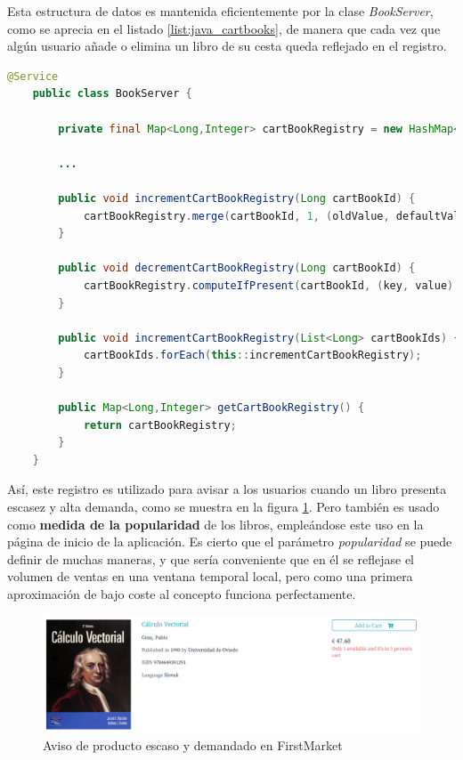 \documentclass[a4paper]{article}
\begin{document}
    Esta estructura de datos es mantenida eficientemente por la clase \emph{BookServer}, como se aprecia en el listado \ref{list:java_cartbooks}, de manera que cada vez que algún usuario añade o elimina un libro de su cesta queda reflejado en el registro.
    \\
    
    \begin{lstlisting}[language=Java,caption=Gestión del registro de libros referenciados en cestas,label=list:java_cartbooks]
    @Service
    public class BookServer {
    
    	private final Map<Long,Integer> cartBookRegistry = new HashMap<>();
    	
    	...
    	
	    public void incrementCartBookRegistry(Long cartBookId) {
		    cartBookRegistry.merge(cartBookId, 1, (oldValue, defaultValue) -> ++oldValue);
	    }
	    
	    public void decrementCartBookRegistry(Long cartBookId) {
		    cartBookRegistry.computeIfPresent(cartBookId, (key, value) -> (value > 1L) ? --value : null);
	    }
	    
	    public void incrementCartBookRegistry(List<Long> cartBookIds) {
	    	cartBookIds.forEach(this::incrementCartBookRegistry);
	    }
	    
	    public Map<Long,Integer> getCartBookRegistry() {
	    	return cartBookRegistry;
	    }
    }
    \end{lstlisting}
    
    Así, este registro es utilizado para avisar a los usuarios cuando un libro presenta escasez y alta demanda, como se muestra en la figura \ref{fig:fm_cartBookRegistry_alert}. Pero también es usado como \textbf{medida de la popularidad} de los libros, empleándose este uso en la página de inicio de la aplicación. Es cierto que el parámetro \emph{popularidad} se puede definir de muchas maneras, y que sería conveniente que en él se reflejase el volumen de ventas en una ventana temporal local, pero como una primera aproximación de bajo coste al concepto funciona perfectamente.
    
    \begin{figure}[htb!]
    	\centering
    	\includegraphics[width=\textwidth]{fm_cartBookRegistry_alert}
    	\caption{Aviso de producto escaso y demandado en FirstMarket}
    	\label{fig:fm_cartBookRegistry_alert}
    \end{figure}
    
\end{document}
